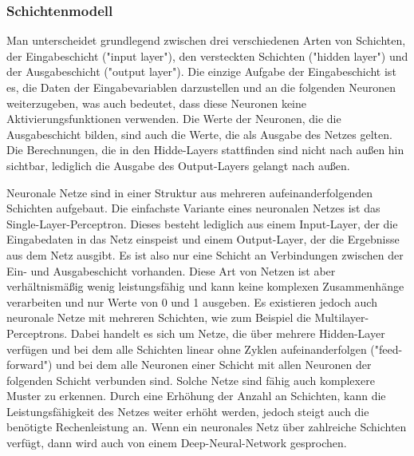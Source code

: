 \subsubsection{Schichtenmodell}\label{subsec:neuronen:schichtenmodell}
Man unterscheidet grundlegend zwischen drei verschiedenen Arten von Schichten, der Eingabeschicht ("input layer"), den versteckten Schichten ("hidden layer") und der Ausgabeschicht ("output layer").
Die einzige Aufgabe der Eingabeschicht ist es, die Daten der Eingabevariablen darzustellen und an die folgenden Neuronen weiterzugeben, was auch bedeutet, dass diese Neuronen keine Aktivierungsfunktionen verwenden.
Die Werte der Neuronen, die die Ausgabeschicht bilden, sind auch die Werte, die als Ausgabe des Netzes gelten.
Die Berechnungen, die in den Hidde-Layers stattfinden sind nicht nach außen hin sichtbar, lediglich die Ausgabe des Output-Layers gelangt nach außen.

Neuronale Netze sind in einer Struktur aus mehreren aufeinanderfolgenden Schichten aufgebaut.
Die einfachste Variante eines neuronalen Netzes ist das Single-Layer-Perceptron. Dieses besteht lediglich aus einem Input-Layer, der die Eingabedaten in das Netz einspeist und einem Output-Layer, der die Ergebnisse aus dem Netz ausgibt.
Es ist also nur eine Schicht an Verbindungen zwischen der Ein- und Ausgabeschicht vorhanden.
Diese Art von Netzen ist aber verhältnismäßig wenig leistungsfähig und kann keine komplexen Zusammenhänge verarbeiten und nur Werte von 0 und 1 ausgeben.
Es existieren jedoch auch neuronale Netze mit mehreren Schichten, wie zum Beispiel die Multilayer-Perceptrons. Dabei handelt es sich um Netze, die über mehrere Hidden-Layer verfügen und bei dem alle Schichten linear ohne Zyklen aufeinanderfolgen ("feed-forward") und bei dem alle Neuronen einer Schicht mit allen Neuronen der folgenden Schicht verbunden sind.
Solche Netze sind fähig auch komplexere Muster zu erkennen.
Durch eine Erhöhung der Anzahl an Schichten, kann die Leistungsfähigkeit des Netzes weiter erhöht werden, jedoch steigt auch die benötigte Rechenleistung an.
Wenn ein neuronales Netz über zahlreiche Schichten verfügt, dann wird auch von einem Deep-Neural-Network gesprochen.